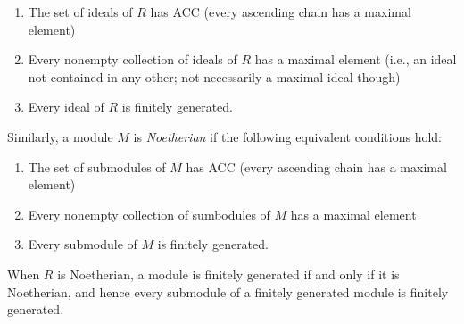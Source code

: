 \documentclass{amsart}[12pt]
\newcommand{\DEF}[1]{\emph{#1}\index{#1}}
\numberwithin{equation}{section}
\theoremstyle{plain} %
\theoremstyle{definition}
\theoremstyle{remark}
\begin{document}
\begin{enumerate}
\item The set of ideals of $R$ has ACC (every ascending chain has a maximal element)
\item Every nonempty collection of ideals  of $R$ has a maximal element (i.e., an ideal not contained in any other; not necessarily a maximal ideal though)
\item Every ideal of $R$ is finitely generated.
\end{enumerate}

Similarly, a module $M$ is  \DEF{Noetherian} if the following equivalent conditions hold:

\begin{enumerate}
\item The set of submodules of $M$ has ACC (every ascending chain has a maximal element)
\item Every nonempty collection of sumbodules of $M$ has a maximal element 
\item Every submodule of $M$ is finitely generated.
\end{enumerate}

When $R$ is Noetherian, a module is finitely generated if and only if it is Noetherian, and hence every submodule of a finitely generated module is finitely generated.
\end{document}
